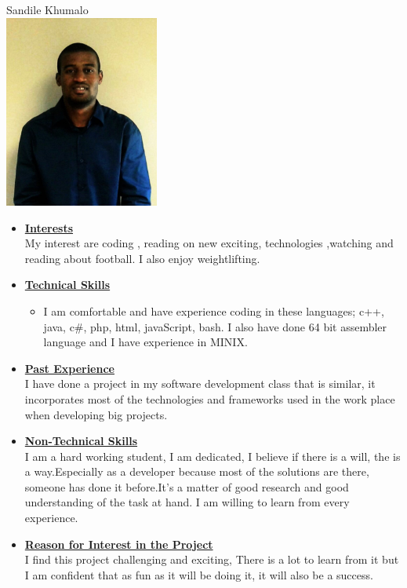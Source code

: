 \documentclass[a4paper,12pt]{article}
\begin{document}
\begin{center}
{\Large Sandile {Khumalo}} \\[0.3cm]
\includegraphics[width=2in]{Sandile.jpg}\\[0.4cm] 
\end{center}



\begin{itemize}
\item {\Large \underline{\textbf{Interests}}}\\[0.2cm]
My interest are coding , reading on new exciting, technologies ,watching and reading about football. I also enjoy weightlifting.


\item {\Large \underline{\textbf{Technical Skills}}}

	\begin{itemize}
		\item I am comfortable and have experience coding in these languages; c++, java, c\#, php, html, javaScript, bash. I also have done 64 bit assembler language and I have experience in MINIX.
	\end{itemize}
\bigskip
\item {\Large \underline{\textbf{Past Experience}}}\\[0.2cm]
I have done a project in my software development class that is similar, it incorporates  most of the technologies and frameworks used in the work place when developing big projects.
\\
\item {\Large \underline{\textbf{Non-Technical Skills}}}\\[0.2cm]
 I am a hard working student, I am dedicated, I believe if there is a will, the is a way.Especially as a developer because most of the solutions are there, someone has done it before.It's a matter of good research and good understanding of the task at hand. I am willing to learn from every experience. 
\\
\item {\Large \underline{\textbf{Reason for Interest in the Project}}}\\[0.2cm]
I find this project challenging and exciting, There is a lot to learn from it but I am confident that as fun as it will be doing it, it will also be a success.

\end{itemize}
\end{document}
